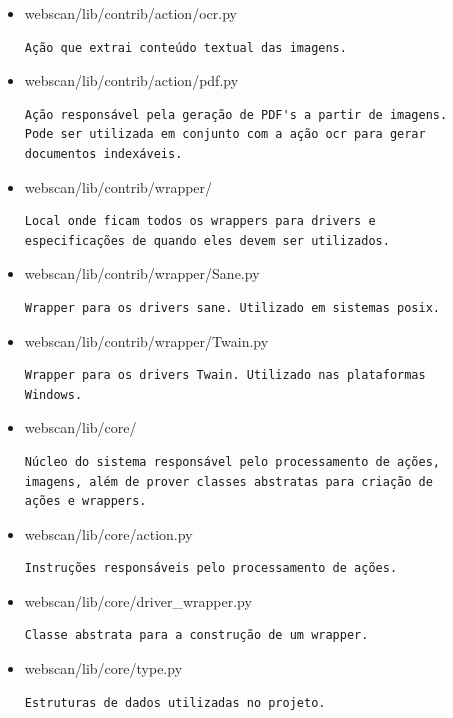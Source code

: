 \begin{itemize}
\item webscan/lib/contrib/action/ocr.py
\begin{verbatim}
Ação que extrai conteúdo textual das imagens.
\end{verbatim}

\item webscan/lib/contrib/action/pdf.py
\begin{verbatim}
Ação responsável pela geração de PDF's a partir de imagens. 
Pode ser utilizada em conjunto com a ação ocr para gerar 
documentos indexáveis.
\end{verbatim}

\item webscan/lib/contrib/wrapper/
\begin{verbatim}
Local onde ficam todos os wrappers para drivers e 
especificações de quando eles devem ser utilizados.
\end{verbatim}

\item webscan/lib/contrib/wrapper/Sane.py
\begin{verbatim}
Wrapper para os drivers sane. Utilizado em sistemas posix.
\end{verbatim}

\item webscan/lib/contrib/wrapper/Twain.py
\begin{verbatim}
Wrapper para os drivers Twain. Utilizado nas plataformas 
Windows.
\end{verbatim}

\item webscan/lib/core/
\begin{verbatim}
Núcleo do sistema responsável pelo processamento de ações, 
imagens, além de prover classes abstratas para criação de 
ações e wrappers.
\end{verbatim}

\item webscan/lib/core/action.py
\begin{verbatim}
Instruções responsáveis pelo processamento de ações.
\end{verbatim}

\item webscan/lib/core/driver\_wrapper.py
\begin{verbatim}
Classe abstrata para a construção de um wrapper.
\end{verbatim}

\item webscan/lib/core/type.py
\begin{verbatim}
Estruturas de dados utilizadas no projeto.
\end{verbatim}


\end{itemize}
